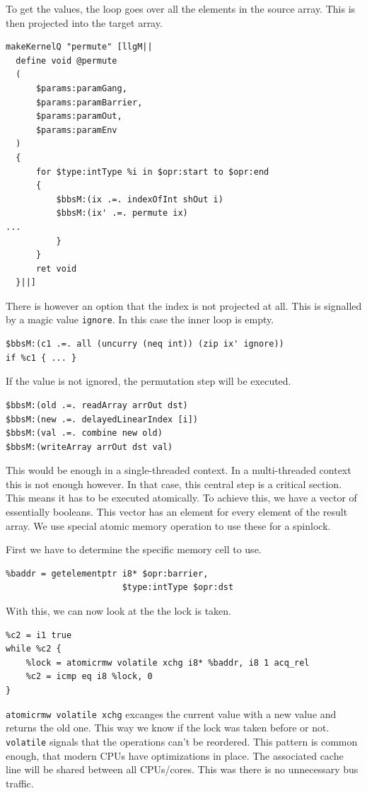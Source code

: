 \documentclass[a4paper,bibliography=totocnumbered,parskip,headsepline]{scrbook}
\begin{document}
To get the values, the loop goes over all the elements in the source array.
This is then projected into the target array.
\begin{lstlisting}
makeKernelQ "permute" [llgM||
  define void @permute
  (
      $params:paramGang,
      $params:paramBarrier,
      $params:paramOut,
      $params:paramEnv
  )
  {
      for $type:intType %i in $opr:start to $opr:end
      {
          $bbsM:(ix .=. indexOfInt shOut i)
          $bbsM:(ix' .=. permute ix)
...
          }
      }
      ret void
  }||]
\end{lstlisting}
There is however an option that the index is not projected at all.
This is signalled by a magic value \lstinline[language=haskell]!ignore!.
In this case the inner loop is empty.
\begin{lstlisting}
$bbsM:(c1 .=. all (uncurry (neq int)) (zip ix' ignore))
if %c1 { ... }
\end{lstlisting}
If the value is not ignored, the permutation step will be executed.
\begin{lstlisting}
$bbsM:(old .=. readArray arrOut dst)
$bbsM:(new .=. delayedLinearIndex [i])
$bbsM:(val .=. combine new old)
$bbsM:(writeArray arrOut dst val)
\end{lstlisting}
This would be enough in a single-threaded context.
In a multi-threaded context this is not enough however.
In that case, this central step is a critical section.
This means it has to be executed atomically.
To achieve this, we have a vector of essentially booleans.
This vector has an element for every element of the result array.
We use special atomic memory operation to use these for a spinlock.

First we have to determine the specific memory cell to use.
\begin{lstlisting}
%baddr = getelementptr i8* $opr:barrier,
                       $type:intType $opr:dst
\end{lstlisting}
With this, we can now look at the the lock is taken.
\begin{lstlisting}
%c2 = i1 true
while %c2 {
    %lock = atomicrmw volatile xchg i8* %baddr, i8 1 acq_rel
    %c2 = icmp eq i8 %lock, 0
}
\end{lstlisting}
\lstinline!atomicrmw volatile xchg! excanges the current value with a new value and returns the old one.
This way we know if the lock was taken before or not.
\lstinline!volatile! signals that the operations can't be reordered.
This pattern is common enough, that modern CPUs have optimizations in place.
The associated cache line will be shared between all CPUs/cores.
This was there is no unnecessary bus traffic.
\end{document}

